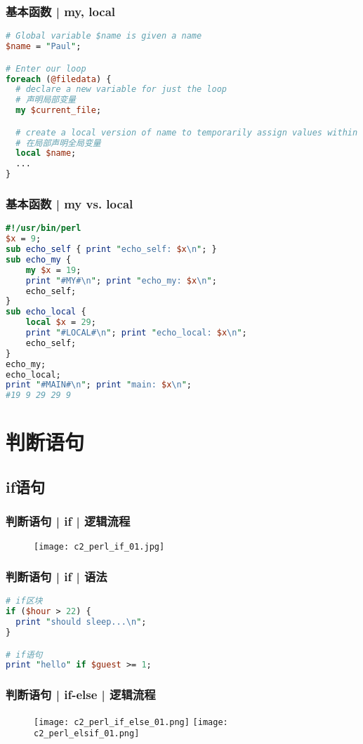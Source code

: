 \begin{frame}[fragile]
  \frametitle{基本函数 | \alert{my}, local}
\begin{lstlisting}[language=Perl]
# Global variable $name is given a name
$name = "Paul";

# Enter our loop
foreach (@filedata) {
  # declare a new variable for just the loop
  # 声明局部变量
  my $current_file;

  # create a local version of name to temporarily assign values within the loop to
  # 在局部声明全局变量
  local $name;
  ...
}
\end{lstlisting}
\end{frame}

\begin{frame}[fragile]
  \frametitle{基本函数 | my vs. local}
\begin{lstlisting}[language=Perl,basicstyle=\small\tt]
#!/usr/bin/perl
$x = 9;
sub echo_self { print "echo_self: $x\n"; }
sub echo_my {
    my $x = 19;
    print "#MY#\n"; print "echo_my: $x\n";
    echo_self;
}
sub echo_local {
    local $x = 29;
    print "#LOCAL#\n"; print "echo_local: $x\n";
    echo_self;
}
echo_my;
echo_local;
print "#MAIN#\n"; print "main: $x\n";
#19 9 29 29 9
\end{lstlisting}
\end{frame}

\section{判断语句}
\subsection{if语句}
\begin{frame}
  \frametitle{判断语句 | if | 逻辑流程}
  \begin{figure}
    \centering
    \texttt{[image: c2\_perl\_if\_01.jpg]}
  \end{figure}
\end{frame}

\begin{frame}[fragile]
  \frametitle{判断语句 | if | \alert{语法}}
\begin{lstlisting}[language=Perl]
# if区块
if ($hour > 22) {
  print "should sleep...\n";
}

# if语句
print "hello" if $guest >= 1;
\end{lstlisting}
\end{frame}

\begin{frame}
  \frametitle{判断语句 | if-else | 逻辑流程}
  \begin{figure}
    \centering
    \texttt{[image: c2\_perl\_if\_else\_01.png]}
    \texttt{[image: c2\_perl\_elsif\_01.png]}
  \end{figure}
\end{frame}

